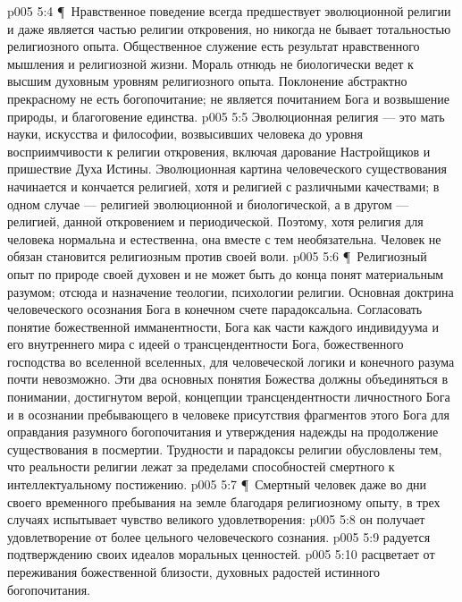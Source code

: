 \vs p005 5:4 \P\ Нравственное поведение всегда предшествует эволюционной религии и даже является частью религии откровения, но никогда не бывает тотальностью религиозного опыта. Общественное служение есть результат нравственного мышления и религиозной жизни. Мораль отнюдь не биологически ведет к высшим духовным уровням религиозного опыта. Поклонение абстрактно прекрасному не есть богопочитание; не является почитанием Бога и возвышение природы, и благоговение единства.
\vs p005 5:5 Эволюционная религия --- это мать науки, искусства и философии, возвысивших человека до уровня восприимчивости к религии откровения, включая дарование Настройщиков и пришествие Духа Истины. Эволюционная картина человеческого существования начинается и кончается религией, хотя и религией с различными качествами; в одном случае --- религией эволюционной и биологической, а в другом --- религией, данной откровением и периодической. Поэтому, хотя религия для человека нормальна и естественна, она вместе с тем необязательна. Человек не обязан становится религиозным против своей воли.
\vs p005 5:6 \P\ Религиозный опыт по природе своей духовен и не может быть до конца понят материальным разумом; отсюда и назначение теологии, психологии религии. Основная доктрина человеческого осознания Бога в конечном счете парадоксальна. Согласовать понятие божественной имманентности, Бога как части каждого индивидуума и его внутреннего мира с идеей о трансцендентности Бога, божественного господства во вселенной вселенных, для человеческой логики и конечного разума почти невозможно. Эти два основных понятия Божества должны объединяться в понимании, достигнутом верой, концепции трансцендентности личностного Бога и в осознании пребывающего в человеке присутствия фрагментов этого Бога для оправдания разумного богопочитания и утверждения надежды на продолжение существования в посмертии. Трудности и парадоксы религии обусловлены тем, что реальности религии лежат за пределами способностей смертного к интеллектуальному постижению.
\vs p005 5:7 \P\ Смертный человек даже во дни своего временного пребывания на земле благодаря религиозному опыту, в трех случаях испытывает чувство великого удовлетворения:
\vs p005 5:8 \bibnobreakspace {} он получает удовлетворение от более цельного человеческого сознания.
\vs p005 5:9 \bibnobreakspace {} радуется подтверждению своих идеалов моральных ценностей.
\vs p005 5:10 \bibnobreakspace {} расцветает от переживания божественной близости, духовных радостей истинного богопочитания.
